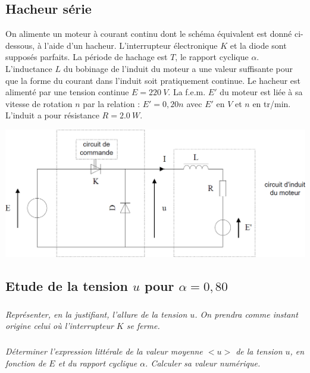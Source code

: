 \documentclass[10pt,fleqn]{article} %
\begin{document}
\begin{multicols}{2}
\begin{multicols}{2}
\newpage

\section*{Hacheur série}

\setcounter{exo}{0}

On alimente un moteur à courant continu dont le schéma équivalent est donné ci-dessous, à
l'aide d'un hacheur.
L'interrupteur électronique $K$ et la diode sont supposés parfaits.
La période de hachage est $T$, le rapport cyclique $\alpha$.
L'inductance $L$ du bobinage de l'induit du moteur a une valeur suffisante pour que la forme du
courant dans l'induit soit pratiquement continue.
Le hacheur est alimenté par une tension continue $E = \SI{220}{V}$.
La f.e.m. $E'$ du moteur est liée à sa vitesse de rotation $n$ par la relation :
$E' = 0,20 n$ avec $E'$ en $V$ et $n$ en tr/min. L'induit a pour résistance $R = \SI{2,0}{W}$.

\begin{center}
\includegraphics[width=\linewidth]{images/fig_03}
\end{center}


\subsection*{Etude de la tension $u$ pour $\alpha = 0,80$}
\subparagraph{}\textit{Représenter, en la justifiant, l'allure de la tension $u$.
On prendra comme instant origine celui où l'interrupteur $K$ se ferme.}
\ifprof
\begin{corrige}
\end{corrige}
\else
\fi

\subparagraph{}\textit{Déterminer l'expression littérale de la valeur moyenne $< u >$ de la tension $u$, en fonction
de $E$ et du rapport cyclique $\alpha$. Calculer sa valeur numérique.}
\ifprof
\begin{corrige}
\end{corrige}
\else
\fi




\end{multicols}
\end{multicols}
\end{document}
